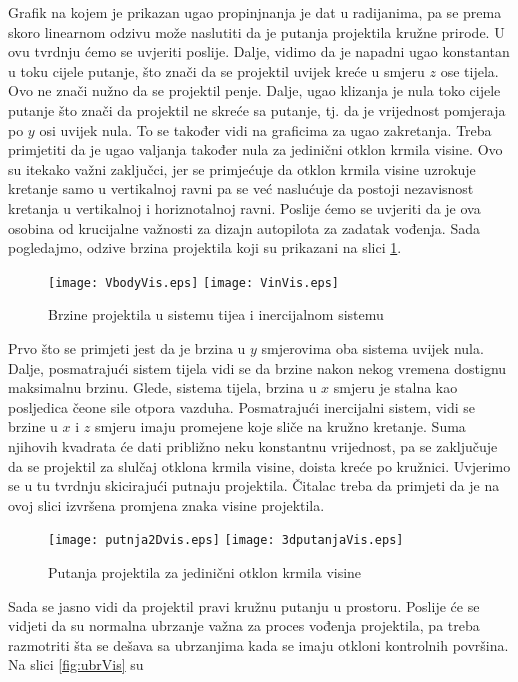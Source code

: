 Grafik na kojem je prikazan ugao propinjnanja je dat u radijanima, pa se prema skoro linearnom 
odzivu može naslutiti da je putanja projektila kružne prirode. U ovu tvrdnju ćemo se uvjeriti poslije. Dalje,
vidimo da je napadni ugao konstantan u toku cijele putanje, što znači da se projektil uvijek kreće u smjeru $z$ ose tijela.
Ovo ne znači nužno da se projektil penje. Dalje, ugao klizanja je nula toko cijele putanje što 
znači da projektil ne skreće sa putanje, tj. da je vrijednost pomjeraja po $y$ osi uvijek nula. To se također 
vidi na graficima za ugao zakretanja. Treba primjetiti da je ugao valjanja također nula za jedinični otklon 
krmila visine. Ovo su itekako važni zaključci, jer se primjećuje da otklon krmila visine uzrokuje 
kretanje samo u vertikalnoj ravni pa se već naslućuje da postoji nezavisnost kretanja u vertikalnoj i horiznotalnoj 
ravni. Poslije ćemo se uvjeriti da je ova osobina od krucijalne važnosti za dizajn autopilota za zadatak vođenja. 
Sada pogledajmo, odzive brzina projektila koji su prikazani na slici \ref{fig:brzine}.
\begin{figure}[!ht]
    \centering 
    \texttt{[image: VbodyVis.eps]}
    \texttt{[image: VinVis.eps]}
    \caption{Brzine projektila u sistemu tijea i inercijalnom sistemu}
    \label{fig:brzine}
\end{figure}
Prvo što se primjeti jest da je brzina u $y$ smjerovima oba sistema uvijek nula. Dalje, posmatrajući 
sistem tijela vidi se da brzine nakon nekog vremena dostignu maksimalnu brzinu. Glede,
sistema tijela, brzina u $x$ smjeru je stalna kao posljedica čeone sile otpora vazduha. Posmatrajući
inercijalni sistem, vidi se brzine u $x$ i $z$ smjeru imaju promejene koje sliče na kružno kretanje. Suma njihovih kvadrata 
će dati približno neku konstantnu vrijednost, pa se zaključuje da se projektil za slulčaj otklona krmila visine, 
doista kreće po kružnici. Uvjerimo se u tu tvrdnju skicirajući putnaju projektila. Čitalac treba 
da primjeti da je na ovoj slici izvršena promjena znaka visine projektila. 
\begin{figure}[!ht]
    \centering 
    \texttt{[image: putnja2Dvis.eps]}
    \texttt{[image: 3dputanjaVis.eps]}
    \caption{Putanja projektila za jedinični otklon krmila visine}
    \label{fig:2dpath}
\end{figure}
Sada se jasno vidi da projektil pravi kružnu putanju u prostoru. 
Poslije će se vidjeti da su normalna ubrzanje važna za proces vođenja projektila, pa treba razmotriti 
šta se dešava sa ubrzanjima kada se imaju otkloni kontrolnih površina. Na slici \ref{fig:ubrVis} su 
